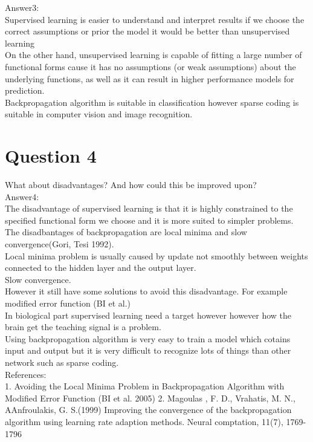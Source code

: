 \documentclass[12pt]{article}
\begin{document}
Answer3:\\
Supervised learning is easier to understand and interpret results if we choose the correct assumptions or prior the model it would be better than unsupervised learning\\
On the other hand, unsupervised learning is capable of fitting a large number of functional forms cause it has no assumptions (or weak assumptions) about the underlying functions, as well as it can result in higher performance models for prediction.\\
Backpropagation algorithm is suitable in classification however sparse coding is suitable in computer vision and image recognition.\\



\section{Question 4}
What about disadvantages? And how could this be improved upon?\\

Answer4:\\
The disadvantage of supervised learning is that it is highly constrained to the specified functional form we choose and it is more suited to simpler problems. \\
The disadbantages of backpropagation are local minima and slow convergence(Gori, Tesi 1992).\\
Local minima problem is usually caused by update not smoothly between weights connected to the hidden layer and the output layer.\\
Slow convergence.\\
However it still have some solutions to avoid this disadvantage. For example modified error function (BI et al.)\\
In biological part supervised learning need a target however however how the brain get the teaching signal is a problem.\\
Using backpropagation algorithm is very easy to train a model which cotains input and output but it is very difficult to recognize lots of things than other network such as sparse coding.\\








References:\\
1. Avoiding the Local Minima Problem in Backpropagation Algorithm with Modified Error
Function (BI et al. 2005)
2. Magoulas , F. D., Vrahatis, M. N., AAnfroulakis, G. S.(1999) Improving the convergence of the backpropagation algorithm using learning rate adaption methods. Neural comptation, 11(7), 1769-1796
\end{document}
